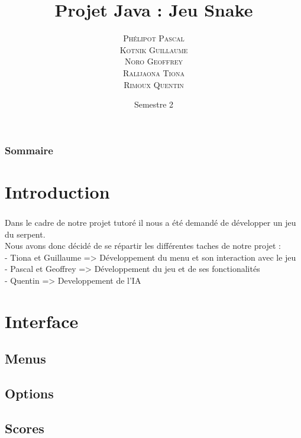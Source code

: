 \documentclass{beamer}
\author[\textsc{Phélipot\and Kotnik\and Noro\and Tiona\and Rimoux}]{\textsc{Phélipot Pascal\\ Kotnik Guillaume\\ Noro Geoffrey\\ Ralijaona Tiona\\ Rimoux Quentin}}
\title[Jeu Snake]{Projet Java : Jeu Snake}
\date{Semestre 2}
\begin{document}
\begin{frame}
\maketitle
\end{frame}

\begin{frame}
\frametitle{Sommaire}

\tableofcontents	
\end{frame}

\section{Introduction}
\begin{frame}
\frametitle{\insertsection}

Dans le cadre de notre projet tutoré il nous a été demandé de développer un jeu du serpent.\\
Nous avons donc décidé de se répartir les différentes taches de notre projet :\\
\indent - Tiona et Guillaume => Développement du menu et son interaction avec le jeu \\
\indent - Pascal et Geoffrey => Développement du jeu et de ses fonctionalités \\
\indent - Quentin => Developpement de l'IA
\end{frame}

\section{Interface}
\subsection{Menus}
\begin{frame}
\frametitle{\insertsubsection}
\framesubtitle{\insertsection}

\end{frame}
\subsection{Options}
\begin{frame}
\frametitle{\insertsubsection}
\framesubtitle{\insertsection}

\end{frame}
\subsection{Scores}
\begin{frame}
\frametitle{\insertsubsection}
\framesubtitle{\insertsection}

\end{frame}
\end{document}
